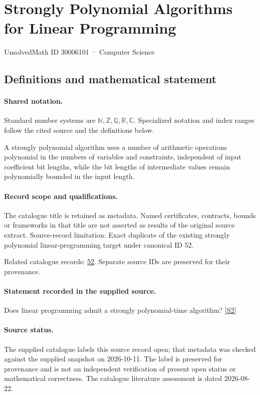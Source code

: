 \documentclass[11pt]{article}
\newcommand{\sref}[2]{\hyperlink{source:#1:#2}{[S#2]}}
\begin{document}
\setcounter{section}{30006100}
\section{Strongly Polynomial Algorithms for Linear Programming}\label{30006101}
{\small\sffamily UnsolvedMath ID 30006101 · Computer Science}
\subsection{Definitions and mathematical statement}

\paragraph{Shared notation.}Standard number systems are $\mathbb N,\mathbb Z,\mathbb Q,\mathbb R,\mathbb C$. Specialized notation and index ranges follow the cited source and the definitions below.


A strongly polynomial algorithm uses a number of arithmetic operations polynomial in the numbers of variables and constraints, independent of input coefficient bit lengths, while the bit lengths of intermediate values remain polynomially bounded in the input length.
\paragraph{Record scope and qualifications.}
The catalogue title is retained as metadata. Named certificates, contracts, bounds or frameworks in that title are not asserted as results of the original source extract.
Source-record limitation: Exact duplicate of the existing strongly polynomial linear-programming target under canonical ID 52.

Related catalogue records: \href{https://mehmetmars7.github.io/Erdosproblems-llm-hunter/problem.html?type=open_problems&id=52}{52}. Separate source IDs are preserved for their provenance.
\paragraph{Statement recorded in the supplied source.}
Does linear programming admit a strongly polynomial-time algorithm? \sref{30006101}{2}
\paragraph{Source status.}
The supplied catalogue labels this source record open; that metadata was checked against the supplied snapshot on 2026-10-11. The label is preserved for provenance and is not an independent verification of present open status or mathematical correctness. The catalogue literature assessment is dated 2026-08-22.
\end{document}

